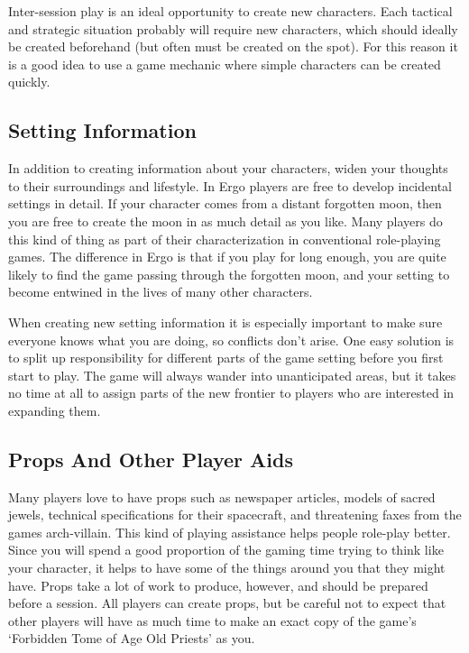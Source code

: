 \documentclass[twoside]{book}
\begin{document}
Inter-session play is an ideal opportunity to create new
characters. Each tactical and strategic situation probably will
require new characters, which should ideally be created beforehand
(but often must be created on the spot). For this reason it is a good
idea to use a game mechanic where simple characters can be created
quickly.

\subsection{Setting Information}

In addition to creating information about your characters, widen your
thoughts to their surroundings and lifestyle. In Ergo players are free
to develop incidental settings in detail. If your character comes from
a distant forgotten moon, then you are free to create the moon in as
much detail as you like. Many players do this kind of thing as part of
their characterization in conventional role-playing games. The
difference in Ergo is that if you play for long enough, you are quite
likely to find the game passing through the forgotten moon, and your
setting to become entwined in the lives of many other characters.

When creating new setting information it is especially important to
make sure everyone knows what you are doing, so conflicts don't
arise. One easy solution is to split up responsibility for different
parts of the game setting before you first start to play. The game
will always wander into unanticipated areas, but it takes no time at
all to assign parts of the new frontier to players who are interested
in expanding them.

\subsection{Props And Other Player Aids}

Many players love to have props such as newspaper articles, models of
sacred jewels, technical specifications for their spacecraft, and
threatening faxes from the games arch-villain. This kind of playing
assistance helps people role-play better. Since you will spend a good
proportion of the gaming time trying to think like your character, it
helps to have some of the things around you that they might
have. Props take a lot of work to produce, however, and should be
prepared before a session. All players can create props, but be
careful not to expect that other players will have as much time to
make an exact copy of the game's `Forbidden Tome of Age Old Priests'
as you.
\end{document}
